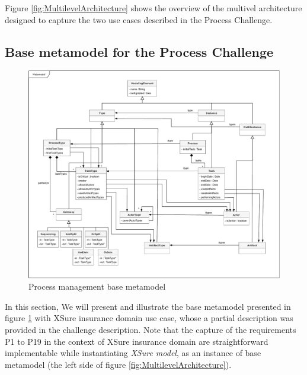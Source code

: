 
Figure \ref{fig:MultilevelArchitecture} shows the overview of the multivel architecture designed to capture the two use cases described in the Process Challenge.


\subsection{Base metamodel for the Process Challenge}

\begin{figure}
 \centering
    \includegraphics[width=1.0 \textwidth]{Figures/Metamodel.pdf}
     \caption{Process management base metamodel}
    \label{fig:BaseMetamodel}
\end{figure}


In this section, We will present and illustrate the base metamodel presented in figure \ref{fig:BaseMetamodel} with XSure insurance domain use case, whose a partial description was provided in the challenge description. Note that the capture of the requirements P1 to P19 in the context of XSure insurance domain are straightforward implementable while instantiating \textit{XSure model}, as an instance of base metamodel (the left side of figure \ref{fig:MultilevelArchitecture}).

